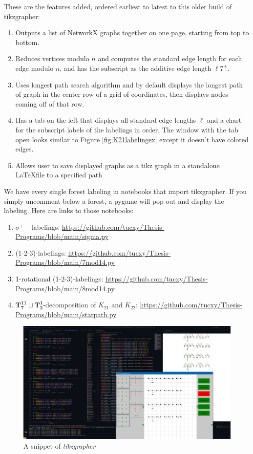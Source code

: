 These are the features added, ordered earliest to latest to this older build of tikzgrapher:\newline
{}
\begin{enumerate}
  \item Outputs a list of NetworkX graphs together on one page, starting from top to bottom.
  \item Reduces vertices modulo $n$ and computes the standard edge length for each edge modulo $n$, and has the subscript as the additive edge length $\ell{7}^{+}$.
  \item Uses longest path search algorithm and by default displays the longest path of graph in the center row of a grid of coordinates, then displays nodes coming off of that row.
  \item Has a tab on the left that displays all standard edge lengths $\ell$ and a chart for the subscript labels of the labelings in order. The window with the tab open looks similar to Figure \ref{fig:K21labelingex} except it doesn't have colored edges.
  \item Allows user to save displayed graphs as a tikz graph in a standalone \LaTeX file to a specified path
\end{enumerate}
We have every single forest labeling in notebooks that import tikzgrapher. If you simply uncomment below a forest, a pygame will pop out and display the labeling. Here are links to those notebooks:
\begin{enumerate}
  \item $\sigma^{+-}$-labelings: \url{https://github.com/tucxy/Thesis-Programs/blob/main/sigma.py}
  \item (1-2-3)-labelings: \url{https://github.com/tucxy/Thesis-Programs/blob/main/7mod14.py}
  \item 1-rotational (1-2-3)-labelings: \url{https://github.com/tucxy/Thesis-Programs/blob/main/8mod14.py}
  \item $\mathbf{T_{7}^{11}\sqcup T_{2}^{1}}$-decomposition of $K_{21}$ and $K_{22}$: \url{https://github.com/tucxy/Thesis-Programs/blob/main/starpath.py}
\end{enumerate}


\begin{figure}[H]
  \centering
  \includegraphics[width=\textwidth]{standalone/Images/snippet_long.JPG}
  \caption{A snippet of \textit{tikzgrapher}}
  \label{fig:TGsnippet}
\end{figure}


